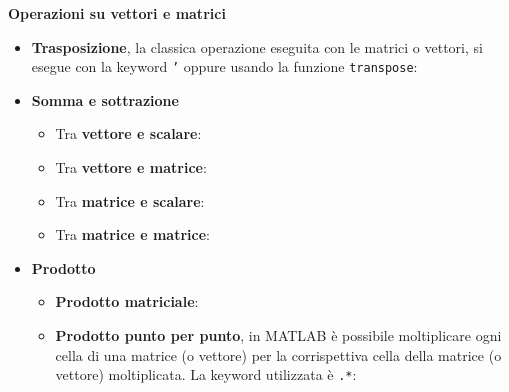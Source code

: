 \documentclass[a4paper]{article}
\begin{document}
    \begin{flushleft}
        \large
        \hypertarget{
            lab: Operazioni su vettori e matrici
        }{
            \textcolor{Red3}{\textbf{Operazioni su vettori e matrici}}
        }
        \label{lab: Operazioni su vettori e matrici}
    \end{flushleft}
    \begin{itemize}
        \item \textbf{Trasposizione}, la classica operazione eseguita con le matrici o vettori, si esegue con la keyword \texttt{'} oppure usando la funzione \texttt{transpose}:
        

        \item \textbf{Somma e sottrazione}
        \begin{itemize}
            \item Tra \textbf{vettore e scalare}:
            

            \item Tra \textbf{vettore e matrice}:
            

            \item Tra \textbf{matrice e scalare}:
            

            \item Tra \textbf{matrice e matrice}:
            
        \end{itemize}

        \item \textbf{Prodotto}
        \begin{itemize}
            \item \textbf{Prodotto matriciale}:
            

            \item \textbf{Prodotto punto per punto}, in MATLAB è possibile moltiplicare ogni cella di una matrice (o vettore) per la corrispettiva cella della matrice (o vettore) moltiplicata. La keyword utilizzata è \texttt{.*}:
            
        \end{itemize}


\end{itemize}
\end{document}
